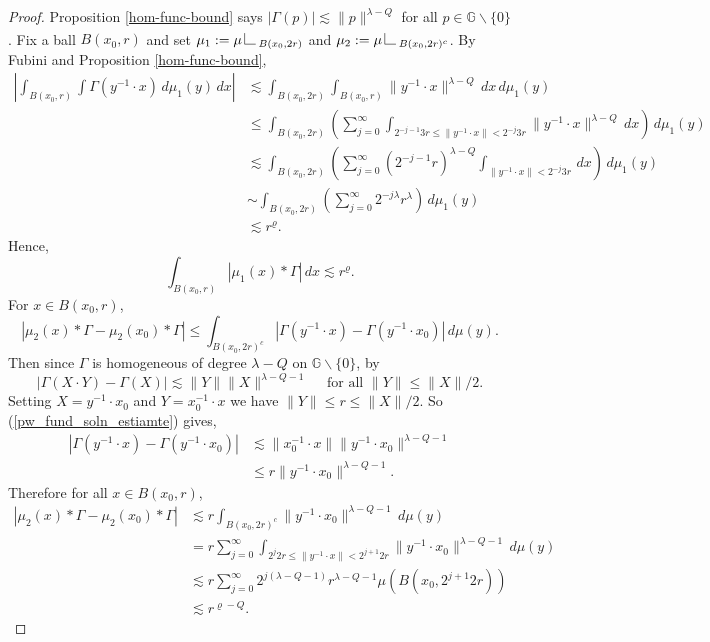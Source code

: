 \documentclass[12pt,a4paper,reqno]{amsart}
\newcommand{\cg}{\Gamma}
\renewcommand{\l}{\lambda}
\newcommand{\G}{\mathbb{G}}
\numberwithin{equation}{section}
\theoremstyle{definition}
\newcommand{\restrict}{\begin{picture}(12,12)
                        \put(2,0){\line(1,0){8}}
                        \put(2,0){\line(0,1){8}}
                       \end{picture}}
\begin{document}
\begin{proof}
Proposition \ref{hom-func-bound} says $|\cg(p)| \lesssim \| p\|^{\l - Q}$ for all $p \in \G \backslash \{0\}$. Fix a ball $B(x_0 ,r)$ and set $\mu_1 := \mu \restrict_{B(x_0 ,2r)}$ and $\mu_2 := \mu \restrict_{B(x_0, 2r)^c}$. By Fubini and Proposition \ref{hom-func-bound}, \begin{align*}
    \left| \int_{B(x_0, r)} \int \cg(y^{-1} \cdot x) \, d\mu_1(y) \,dx \right| &\lesssim \int_{B(x_0 ,2r)} \int_{B(x_0, r)} \| y^{-1} \cdot x\|^{\l - Q} \,dx \,d\mu_1(y) \\ &\leq \int_{B(x_0 ,2r)} \left( \sum_{j=0}^{\infty} \int_{2^{-j-1}3r \leq \| y^{-1} \cdot x\| < 2^{-j}3r} \| y^{-1} \cdot x\|^{\l - Q} \,dx \right) \,d\mu_1(y) \\ &\lesssim \int_{B(x_0 ,2r)} \left( \sum_{j=0}^{\infty} (2^{-j-1} r)^{\l - Q} \int_{\| y ^{-1} \cdot x\| < 2^{-j}3r} \,dx \right) \,d\mu_1(y) \\ &\sim \int_{B(x_0 ,2r)} \left( \sum_{j=0}^{\infty} 2^{-j \l} r^{\l} \right) \, d\mu_1(y) \\ &\lesssim r^{\varrho}.
\end{align*}
Hence, \begin{equation}\label{estimate_on_mu_1}
\int_{B(x_0,r)} \left|  \mu_1(x) \ast \cg \right|\,dx \lesssim r^{\varrho}.    
\end{equation}
For $x \in B(x_0,r)$, $$\left|  \mu_2(x) \ast \cg -  \mu_2(x_0) \ast \cg \right| \leq \int_{B(x_0 ,2r)^c} \left| \cg(y^{-1} \cdot x) - \cg(y^{-1} \cdot x_0) \right| \, d\mu(y).$$ Then since $\cg$ is homogeneous of degree $\l - Q$ on $\G \backslash \{ 0\}$, by \cite[Proposition 3.1.40]{FR}\begin{equation}\label{pw_fund_soln_estiamte}
 \left| \cg( X \cdot Y) - \cg(X)\right| \lesssim \| Y\| \|X\|^{\l - Q -1} \quad \text{ for all }\| Y\| \leq \|X\|/2.   
\end{equation}
Setting $X = y^{-1} \cdot x_0$ and $Y = x_0^{-1} \cdot x$ we have $\| Y\| \leq r \leq \| X\| / 2.$ So (\ref{pw_fund_soln_estiamte}) gives, \begin{align*}
\left| \cg(y^{-1} \cdot x) - \cg(y^{-1} \cdot x_0) \right| &\lesssim \| x_0^{-1} \cdot x\| \| y^{-1} \cdot x_0\|^{\l- Q -1} \\ &\leq r \| y^{-1} \cdot x_0\|^{\l - Q -1}.
\end{align*}
Therefore for all $x \in B(x_0, r)$, \begin{align*}
\left|  \mu_2(x) \ast \cg - \mu_2(x_0) \ast \cg \right| &\lesssim r \int_{B(x_0 , 2r)^c} \| y^{-1} \cdot x_0\|^{\l -Q - 1} \,d\mu(y) \\ &= r \sum_{j=0}^{\infty} \int_{2^j 2r \leq \| y^{-1} \cdot x\| < 2^{j+1}2r} \| y^{-1} \cdot x_0\|^{\l - Q-1}\,d\mu(y) \\ &\lesssim r \sum_{j=0}^{\infty} 2^{j(\l - Q -1)} r^{\l - Q - 1} \mu(B(x_0, 2^{j+1} 2r)) \\ &\lesssim r^{\varrho - Q}.

\end{align*}
\end{proof}
\end{document}
